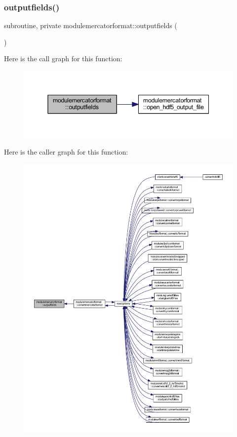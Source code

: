 \subsubsection{\texorpdfstring{outputfields()}{outputfields()}}
{\footnotesize\ttfamily subroutine, private modulemercatorformat\+::outputfields (\begin{DoxyParamCaption}{ }\end{DoxyParamCaption})\hspace{0.3cm}{\ttfamily [private]}}

Here is the call graph for this function\+:\nopagebreak
\begin{figure}[H]
\begin{center}
\leavevmode
\includegraphics[width=345pt]{namespacemodulemercatorformat_a9ef4ded8a79fc7dae92a2f3410aa9ab4_cgraph}
\end{center}
\end{figure}
Here is the caller graph for this function\+:\nopagebreak
\begin{figure}[H]
\begin{center}
\leavevmode
\includegraphics[width=350pt]{namespacemodulemercatorformat_a9ef4ded8a79fc7dae92a2f3410aa9ab4_icgraph}
\end{center}
\end{figure}
